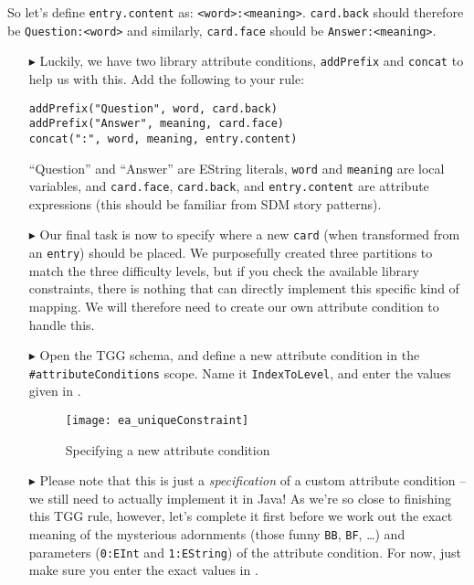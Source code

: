 So let's define \texttt{entry\-.cont\-ent} as: \texttt{<word>:<mean\-ing>}. 
\texttt{card\-.back} should therefore be \texttt{Quest\-ion:<word>} and similarly, \texttt{card\-.face} should be \texttt{Ans\-wer:<mean\-ing>}. 

\begin{enumerate}
\item[$\blacktriangleright$] Luckily, we have two library attribute conditions, \texttt{addPrefix} and \texttt{concat} to help us with this.
Add the following to your rule:

\verb|addPrefix("Question", word, card.back)|\\  
\verb|addPrefix("Answer", meaning, card.face)|\\
\verb|concat(":", word, meaning, entry.content)|

``Question'' and ``Answer'' are EString literals, \texttt{word} and \texttt{meaning} are local variables, and \texttt{card.face}, \texttt{card.back}, and \texttt{entry.content} are attribute expressions (this should be familiar from SDM story patterns).

\item[$\blacktriangleright$] Our final task is now to specify where a new \texttt{card} (when transformed from an \texttt{entry}) should be placed.  
We purposefully created three partitions to match the three difficulty levels, but if you check the available library constraints, there is nothing that can directly implement this specific kind of mapping. 
We will therefore need to create our own attribute condition to handle this.

\item[$\blacktriangleright$] Open the TGG schema, and define a new attribute condition in the \texttt{\#attributeConditions} scope. 
Name it \texttt{IndexToLevel}, and enter the values given in .

\begin{figure}[htbp]
\begin{center}
  \texttt{[image: ea\_uniqueConstraint]}
  \caption{Specifying a new attribute condition}
  \label{ea:create_new_constraint}
\end{center}
\end{figure}
\FloatBarrier

\item[$\blacktriangleright$] Please note that this is just a \emph{specification} of a custom attribute condition -- we still need to actually implement it in Java! 
As we're so close to finishing this TGG rule, however, let's complete it first before we work out the exact meaning of the mysterious adornments (those funny \texttt{BB}, \texttt{BF}, \dots) and parameters (\texttt{0:EInt} and \texttt{1:EString}) of the attribute condition. 
For now, just make sure you enter the exact values in . 


\end{enumerate}
